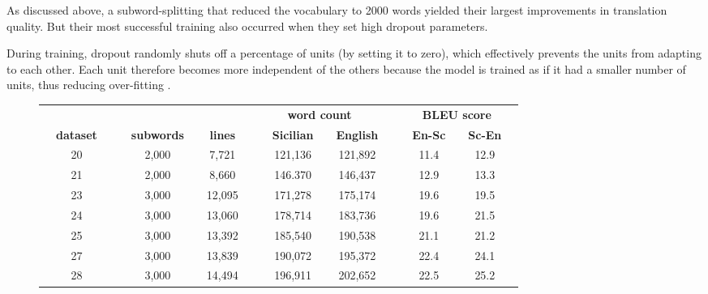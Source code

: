 \documentclass[10pt,letterpaper]{article}
\begin{document}
As discussed above, a subword-splitting that reduced the vocabulary to
2000 words yielded their largest improvements in translation quality.
But their most successful training also occurred when they set high dropout parameters.

During training, dropout randomly shuts off a percentage of units (by setting it to zero),
which effectively prevents the units from adapting to each other.
Each unit therefore becomes more independent of the others because the model is trained
as if it had a smaller number of units, thus reducing over-fitting
\citep{srivastava2014dropout}.


\begin{figure}[t]
\begin{center}
\begin{tabular}{ccc|ccccc|ccccc|ccccc}
  & & & & & & & & \multicolumn{4}{c}{ \textbf{word count} } & & \multicolumn{5}{c}{ \textbf{BLEU score} }\\
  \hspace{0.125in} &
  \textbf{dataset} & \hspace{0.125in} &  \hspace{0.125in} & \textbf{subwords} & \hspace{0.125in} & \textbf{lines} &
  \hspace{0.125in} & \hspace{0.125in} &
  \textbf{Sicilian} & \hspace{0.125in} &  \textbf{English} & \hspace{0.125in} &
  \hspace{0.125in} &  \textbf{En-Sc} & \hspace{0.125in} & \textbf{Sc-En} & \hspace{0.125in} \\
  \hline
  &  20  & & &  2,000  & &  7,721  & & &  121,136  & &  121,892  & & &  11.4  & &  12.9  & \\
  &  21  & & &  2,000  & &  8,660  & & &  146.370  & &  146,437  & & &  12.9  & &  13.3  & \\
  &  23  & & &  3,000  & & 12,095  & & &  171,278  & &  175,174  & & &  19.6  & &  19.5  & \\
  &  24  & & &  3,000  & & 13,060  & & &  178,714  & &  183,736  & & &  19.6  & &  21.5  & \\
  &  25  & & &  3,000  & & 13,392  & & &  185,540  & &  190,538  & & &  21.1  & &  21.2  & \\
  &  27  & & &  3,000  & & 13,839  & & &  190,072  & &  195,372  & & &  22.4  & &  24.1  & \\
  &  28  & & &  3,000  & & 14,494  & & &  196,911  & &  202,652  & & &  22.5  & &  25.2  & \\
  \hline
\end{tabular}
\end{center}
\end{figure}
\end{document}
